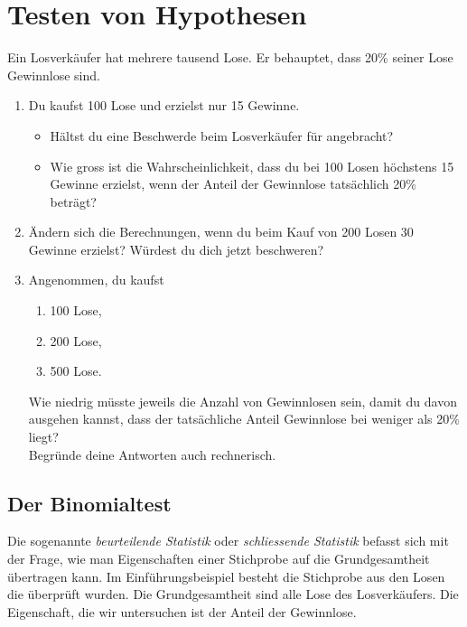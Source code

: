 \section{Testen von Hypothesen}

\begin{LA}
    {}{}
    Ein Losverkäufer hat mehrere tausend Lose. Er behauptet, dass 20\% seiner Lose Gewinnlose sind.

    \begin{enumerate}
        \item Du kaufst 100 Lose und erzielst nur 15 Gewinne.
              \begin{itemize}
                  \item Hältst du eine Beschwerde beim Losverkäufer für angebracht?
                  \item Wie gross ist die Wahrscheinlichkeit, dass du bei 100 Losen höchstens 15 Gewinne erzielst, wenn der Anteil der Gewinnlose tatsächlich 20\% beträgt?
              \end{itemize}

        \item Ändern sich die Berechnungen, wenn du beim Kauf von 200 Losen 30 Gewinne erzielst? Würdest du dich jetzt beschweren?

        \item Angenommen, du kaufst
              \begin{enumerate}
                  \item 100 Lose,
                  \item 200 Lose,
                  \item 500 Lose.
              \end{enumerate}
              Wie niedrig müsste jeweils die Anzahl von Gewinnlosen sein, damit du davon ausgehen kannst, dass der tatsächliche Anteil Gewinnlose bei weniger als 20\% liegt? \\
              Begründe deine Antworten auch rechnerisch.
    \end{enumerate}

\end{LA}

\clearpage

\subsection{Der Binomialtest}

Die sogenannte \textit{beurteilende Statistik} oder  \textit{schliessende Statistik} befasst sich mit der Frage, wie man Eigenschaften einer Stichprobe auf die Grundgesamtheit übertragen kann. Im Einführungsbeispiel besteht die Stichprobe aus den Losen die überprüft wurden. Die Grundgesamtheit sind alle Lose des Losverkäufers. Die Eigenschaft, die wir untersuchen ist der Anteil der Gewinnlose.

